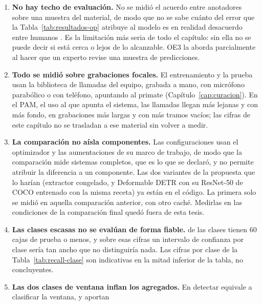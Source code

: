 \begin{enumerate}
    \item \textbf{No hay techo de evaluación.} No se midió el acuerdo entre
          anotadores sobre una muestra del material, de modo que no se sabe cuánto
          del error que la Tabla~\ref{tab:resultados-op} atribuye al modelo es en
          realidad desacuerdo entre humanos
          \citep{leroy_reliability_2018,koga_lead_2024}. Es la limitación más seria de todo el
          capítulo: sin ella no se puede decir si \rRecallYol{} está cerca o lejos
          de lo alcanzable. OE3 la aborda parcialmente al hacer que un experto
          revise una muestra de predicciones.
    \item \textbf{Todo se midió sobre grabaciones focales.} El entrenamiento y la
          prueba usan la biblioteca de llamadas del equipo, grabada a mano,
          con micrófono parabólico o con teléfono, apuntando al primate
          (Capítulo~\ref{cap:curacion}).
          En el PAM, el uso al que apunta el sistema, las llamadas llegan más
          lejanas y con más fondo, en grabaciones más largas y con más tramos
          vacíos; las cifras de este capítulo no se trasladan a ese material sin
          volver a medir.
    \item \textbf{La comparación no aísla componentes.} Las configuraciones
          usan el optimizador y las aumentaciones de su marco de trabajo, de modo
          que la comparación mide sistemas completos, que es lo que se declaró, y
          no permite atribuir la diferencia a un componente. Las dos variantes de
          la propuesta que lo harían (extractor congelado, y Deformable DETR con
          su ResNet-50 de COCO entrenado con la misma receta) ya están en el
          código. La primera solo se midió en aquella comparación anterior, con
          otro caché. Medirlas en las condiciones de la comparación final quedó fuera
          de esta tesis.
    \item \textbf{Las clases escasas no se evalúan de forma fiable.}
          \rNScarce{} de las \nClasses{} clases tienen 60 cajas de prueba o menos,
          y sobre esas cifras un intervalo de confianza por clase sería tan ancho
          que no distinguiría nada. Las cifras por clase de la
          Tabla~\ref{tab:recall-clase} son indicativas en la mitad inferior de la
          tabla, no concluyentes.
    \item \textbf{Las dos clases de ventana inflan los agregados.} En
          \rWindowClasses{} detectar equivale a clasificar la ventana, y aportan

\end{enumerate}
